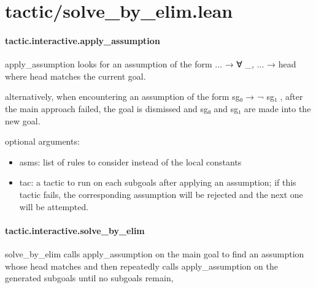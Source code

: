 \documentclass{article}
\begin{document}
\section{tactic/solve\_by\_elim.lean}\paragraph{tactic.interactive.apply\_assumption}
\par
\colorbox[RGB]{253,246,227}{{{{\color[RGB]{101, 123, 131} apply\_assumption }}}} looks for an assumption of the form 
\colorbox[RGB]{253,246,227}{{{{\color[RGB]{101, 123, 131} ...  }}}{{{\color[RGB]{133, 153, 0} → }}}{{{\color[RGB]{101, 123, 131}   }}}{{{\color[RGB]{133, 153, 0} ∀ }}}{{{\color[RGB]{101, 123, 131}  \_, ...  }}}{{{\color[RGB]{133, 153, 0} → }}}{{{\color[RGB]{101, 123, 131}  head }}}}where 
\colorbox[RGB]{253,246,227}{{{{\color[RGB]{101, 123, 131} head }}}} matches the current goal.
\par
alternatively, when encountering an assumption of the form 
\colorbox[RGB]{253,246,227}{{{{\color[RGB]{101, 123, 131} sg₀  }}}{{{\color[RGB]{133, 153, 0} → }}}{{{\color[RGB]{101, 123, 131}   }}}{{{\color[RGB]{181, 137, 0} ¬ }}}{{{\color[RGB]{101, 123, 131}  sg₁ }}}},
after the main approach failed, the goal is dismissed and 
\colorbox[RGB]{253,246,227}{{{{\color[RGB]{101, 123, 131} sg₀ }}}} and 
\colorbox[RGB]{253,246,227}{{{{\color[RGB]{101, 123, 131} sg₁ }}}}are made into the new goal.
\par
optional arguments:
\begin{itemize}\item asms: list of rules to consider instead of the local constants

\item tac:  a tactic to run on each subgoals after applying an assumption; if
this tactic fails, the corresponding assumption will be rejected and
the next one will be attempted.

\end{itemize}\paragraph{tactic.interactive.solve\_by\_elim}
\par
\colorbox[RGB]{253,246,227}{{{{\color[RGB]{101, 123, 131} solve\_by\_elim }}}} calls 
\colorbox[RGB]{253,246,227}{{{{\color[RGB]{101, 123, 131} apply\_assumption }}}} on the main goal to find an assumption whose head matches
and then repeatedly calls 
\colorbox[RGB]{253,246,227}{{{{\color[RGB]{101, 123, 131} apply\_assumption }}}} on the generated subgoals until no subgoals remain,
\end{document}
